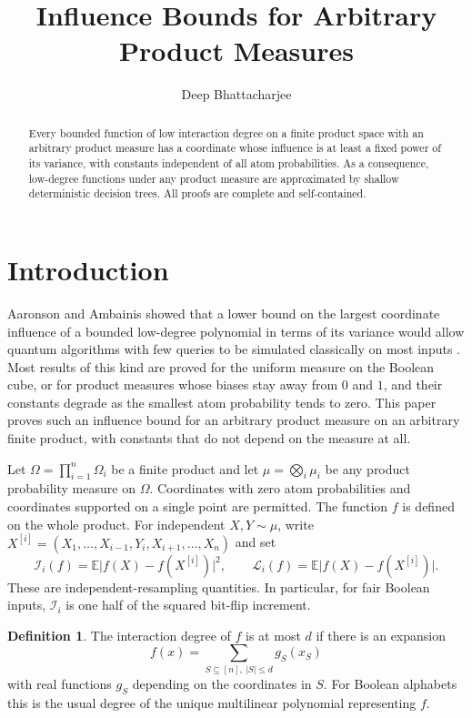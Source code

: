 \documentclass[11pt,reqno]{amsart}
\title[Influence bounds for product measures]{Influence Bounds for Arbitrary Product Measures}
\author{Deep Bhattacharjee}
\theoremstyle{definition}
\newtheorem{definition}[theorem]{Definition}
\theoremstyle{remark}
\newcommand{\E}{\mathbb E}
\newcommand{\cI}{\mathcal I}
\newcommand{\cL}{\mathcal L}
\newcommand{\abs}[1]{\lvert #1\rvert}
\numberwithin{equation}{section}
\begin{document}
\begin{abstract}
Every bounded function of low interaction degree on a finite product space with an arbitrary product measure has a coordinate whose influence is at least a fixed power of its variance, with constants independent of all atom probabilities. As a consequence, low-degree functions under any product measure are approximated by shallow deterministic decision trees. All proofs are complete and self-contained.
\end{abstract}
\maketitle

\section{Introduction}

Aaronson and Ambainis showed that a lower bound on the largest coordinate influence of a bounded low-degree polynomial in terms of its variance would allow quantum algorithms with few queries to be simulated classically on most inputs \cite{AA}. Most results of this kind are proved for the uniform measure on the Boolean cube, or for product measures whose biases stay away from $0$ and $1$, and their constants degrade as the smallest atom probability tends to zero. This paper proves such an influence bound for an arbitrary product measure on an arbitrary finite product, with constants that do not depend on the measure at all.


Let $\Omega=\prod_{i=1}^n\Omega_i$ be a finite product and let
$\mu=\bigotimes_i\mu_i$ be any product probability measure on $\Omega$.
Coordinates with zero atom probabilities and coordinates supported on a single
point are permitted. The function $f$ is defined on the whole product.
For independent $X,Y\sim\mu$, write
$X^{[i]}=(X_1,\ldots,X_{i-1},Y_i,X_{i+1},\ldots,X_n)$ and set
\begin{equation}\label{eq:influences}
 \cI_i(f)=\E\abs{f(X)-f(X^{[i]})}^2,
 \qquad \cL_i(f)=\E\abs{f(X)-f(X^{[i]})}.
\end{equation}
These are independent-resampling quantities. In particular, for fair Boolean
inputs, $\cI_i$ is one half of the squared bit-flip increment.

\begin{definition}
The interaction degree of $f$ is at most $d$ if there is an expansion
\[
 f(x)=\sum_{S\subseteq[n],\ |S|\le d}g_S(x_S)
\]
with real functions $g_S$ depending on the coordinates in $S$.
For Boolean alphabets this is the usual degree of the unique multilinear
polynomial representing $f$.
\end{definition}
\end{document}
